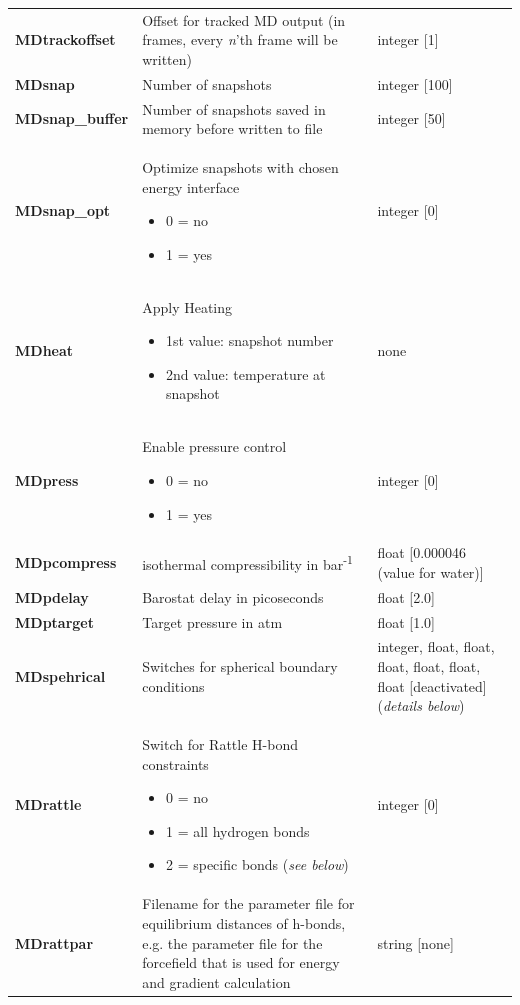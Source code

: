 \documentclass[10pt,a4paper]{article} %
\begin{document}
\begin{longtable}{|p{3.5cm}|p{5cm}|p{3cm}|}
		\textbf{MDtrackoffset} & Offset for tracked MD output (in frames, every \textit{n}'th frame will be written)& integer [1] \\
		\textbf{MDsnap} & Number of snapshots & integer [100] \\
		\textbf{MDsnap\_buffer} & Number of snapshots saved in memory before written to file & integer [50] \\
		\textbf{MDsnap\_opt} & Optimize snapshots with chosen energy interface\begin{itemize} \item 0 = no \item 1 = yes\end{itemize} & integer [0] \\
		\textbf{MDheat}  & Apply Heating \begin{itemize}\item1st value: snapshot number\item2nd value: temperature at snapshot\end{itemize} & none\\
		\textbf{MDpress} & Enable pressure control\begin{itemize} \item 0 = no \item 1 = yes\end{itemize}& integer [0]\\
		\textbf{MDpcompress} & isothermal compressibility in bar\textsuperscript{-1} & float [0.000046 (value for water)] \\ 
		\textbf{MDpdelay} & Barostat delay in picoseconds & float [2.0]\\
		\textbf{MDptarget} & Target pressure in atm & float [1.0] \\
		\textbf{MDspehrical} & Switches for spherical boundary conditions & integer, float, float, float, float, float, float [deactivated] (\textit{details below}) \\
		\textbf{MDrattle} & Switch for Rattle\supercite{rattle} H-bond constraints\begin{itemize} \item 0 = no \item 1 = all hydrogen bonds \item 2 = specific bonds (\textit{see below}) \end{itemize} & integer [0] \\
		\textbf{MDrattpar} & Filename for the parameter file for equilibrium distances of h-bonds, e.g. the parameter file for the forcefield that is used for energy and gradient calculation & string [none]  \\

\end{longtable}
\end{document}
